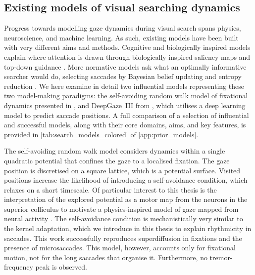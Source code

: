 \subsection{Existing models of visual searching dynamics}\label{subsec:existing_models}
Progress towards modelling gaze dynamics during visual search spans physics, neuroscience, and machine learning. As such, existing models have been built with very different aims and methods. Cognitive and biologically inspired models explain where attention is drawn through biologically-inspired saliency maps and top-down guidance \cite{itti_model_1998, wolfe_guided_2021, Gayet2025-fv}. More normative models ask what an optimally informative searcher would do, selecting saccades by Bayesian belief updating and entropy reduction \cite{najemnik_optimal_2005}. We here examine in detail two influential models representing these two model-making paradigms: the self-avoiding random walk model of fixational dynamics presented in \cite{engbert_integrated_2011, Herrmann2017-hw}, and DeepGaze~III from \cite{kummerer_deepgaze_2022}, which utilises a deep learning model to predict saccade positions. A full comparison of a selection of influential and successful models, along with their core domains, aims, and key features, is provided in \cref{tab:search_models_colored} of \cref{app:prior_models}.

The self-avoiding random walk model \cite{engbert_integrated_2011} considers dynamics within a single quadratic potential that confines the gaze to a localised fixation. The gaze position is discretised on a square lattice, which is a potential surface. Visited positions increase the likelihood of introducing a self-avoidance condition, which relaxes on a short timescale. Of particular interest to this thesis is the interpretation of the explored potential as a motor map from the neurons in the superior colliculus to motivate a physics-inspired model of gaze mapped from neural activity \cite{doi:10.1126/science.1166112, CARPENTER2000R291, Sparks2002-zb}. The self-avoidance condition is mechanistically very similar to the kernel adaptation, which we introduce in this thesis to explain rhythmicity in saccades. This work successfully reproduces superdiffusion in fixations and the presence of microsaccades. This model, however, accounts only for fixational motion, not for the long saccades that organise it. Furthermore, no tremor-frequency peak is observed.

